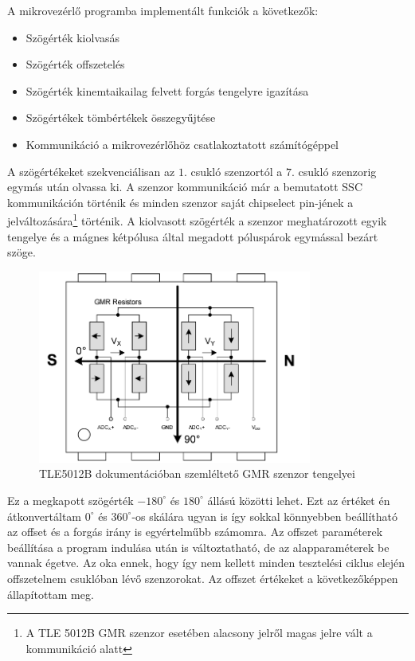 A mikrovezérlő programba implementált funkciók a következők:

\begin{itemize}
\item Szögérték kiolvasás
\item Szögérték offszetelés
\item Szögérték kinemtaikailag felvett forgás tengelyre igazítása
\item Szögértékek tömbértékek összegyűjtése
\item Kommunikáció a mikrovezérlőhöz csatlakoztatott számítógéppel
\end{itemize}

A szögértékeket szekvenciálisan az $1.$ csukló szenzortól a $7.$ csukló szenzorig egymás után olvassa ki. A szenzor kommunikáció már a bemutatott SSC kommunikáción történik és minden szenzor saját chipselect pin-jének a jelváltozására\footnote{A TLE 5012B GMR szenzor esetében alacsony jelről magas jelre vált a kommunikáció alatt} történik. A kiolvasott szögérték a szenzor meghatározott egyik tengelye és a mágnes kétpólusa által megadott póluspárok egymással bezárt szöge.

\begin{figure}[!ht]
\centering
\includegraphics[width=90mm, keepaspectratio]{figures/Szenzor/szenzor_szog}
\caption{TLE5012B dokumentációban szemléltető GMR szenzor tengelyei}
\label{fig:szenzor_szogek}
\end{figure}

Ez a megkapott szögérték $-180^\circ$ és $180^\circ$ állású közötti lehet. Ezt az értéket én átkonvertáltam $0^\circ$ és $360^\circ$-os skálára ugyan is így sokkal könnyebben beállítható az offset és a forgás irány is egyértelműbb számomra. Az offszet paraméterek beállítása a program indulása után is változtatható, de az alapparaméterek be vannak égetve. Az oka ennek, hogy így nem kellett minden tesztelési ciklus elején offszetelnem csuklóban lévő szenzorokat. Az offszet értékeket a következőképpen állapítottam meg.

